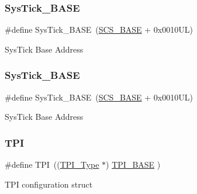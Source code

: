 \subsubsection{\texorpdfstring{Sys\+Tick\+\_\+\+B\+A\+SE}{SysTick\_BASE}\hspace{0.1cm}{\footnotesize\ttfamily [6/7]}}
{\footnotesize\ttfamily \#define Sys\+Tick\+\_\+\+B\+A\+SE~(\hyperlink{group___c_m_s_i_s__core__base_ga3c14ed93192c8d9143322bbf77ebf770}{S\+C\+S\+\_\+\+B\+A\+SE} +  0x0010\+U\+L)}

Sys\+Tick Base Address \mbox{\label{group___c_m_s_i_s__core__base_ga58effaac0b93006b756d33209e814646}} 
\subsubsection{\texorpdfstring{Sys\+Tick\+\_\+\+B\+A\+SE}{SysTick\_BASE}\hspace{0.1cm}{\footnotesize\ttfamily [7/7]}}
{\footnotesize\ttfamily \#define Sys\+Tick\+\_\+\+B\+A\+SE~(\hyperlink{group___c_m_s_i_s__core__base_ga3c14ed93192c8d9143322bbf77ebf770}{S\+C\+S\+\_\+\+B\+A\+SE} +  0x0010\+U\+L)}

Sys\+Tick Base Address \mbox{\label{group___c_m_s_i_s__core__base_ga8b4dd00016aed25a0ea54e9a9acd1239}} 
\subsubsection{\texorpdfstring{T\+PI}{TPI}\hspace{0.1cm}{\footnotesize\ttfamily [1/4]}}
{\footnotesize\ttfamily \#define T\+PI~((\hyperlink{struct_t_p_i___type}{T\+P\+I\+\_\+\+Type}       $\ast$)     \hyperlink{group___c_m_s_i_s__core__base_ga2b1eeff850a7e418844ca847145a1a68}{T\+P\+I\+\_\+\+B\+A\+SE}      )}

T\+PI configuration struct \mbox{\label{group___c_m_s_i_s__core__base_ga8b4dd00016aed25a0ea54e9a9acd1239}} 
